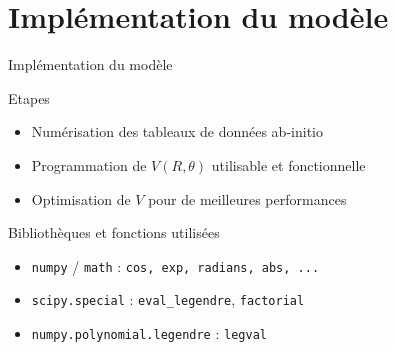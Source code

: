 \documentclass[10pt, aspectratio=169]{beamer}
\begin{document}
\section{Implémentation du modèle}

\begin{frame}{Implémentation du modèle}
  \begin{block}{Etapes}
    \begin{itemize}
      \item Numérisation des tableaux de données ab-initio
      \item Programmation de $V(R,\theta)$ utilisable et fonctionnelle
      \item Optimisation de $V$ pour de meilleures performances

    \end{itemize}
  \end{block}

  \begin{exampleblock}{Bibliothèques et fonctions utilisées}
    \begin{itemize}
      \item \texttt{numpy} / \texttt{math} : \texttt{cos, exp, radians, abs, ...}
      \item \texttt{scipy.special} : \texttt{eval\_legendre}, \texttt{factorial}
      \item \texttt{numpy.polynomial.legendre} : \texttt{legval}
    \end{itemize}
    
  \end{exampleblock}
  
\end{frame}
\end{document}
